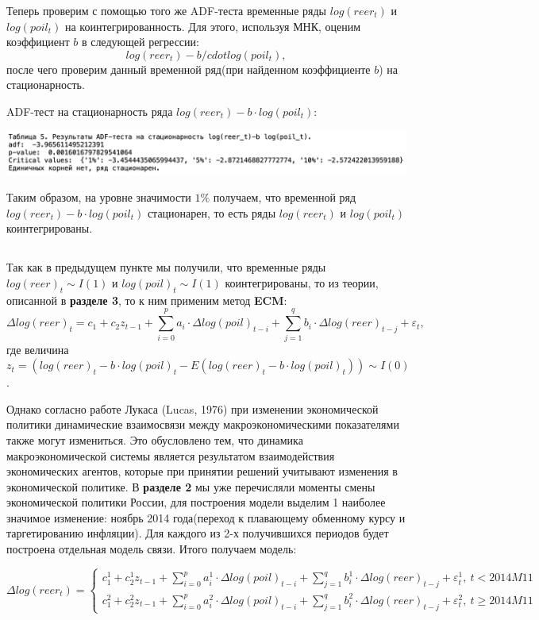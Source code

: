 \documentclass{article}
\begin{document}
Теперь проверим с помощью того же ADF-теста временные ряды $log(reer_t)$ и $log(poil_t)$ на коинтегрированность. Для этого, используя МНК, оценим коэффициент $b$ в следующей регрессии:
$$log(reer_t)-b/cdot log(poil_t),$$
после чего проверим данный временной ряд(при найденном коэффициенте $b$) на стационарность.

ADF-тест на стационарность ряда $log(reer_t)-b\cdot log(poil_t)$:
\begin{center}
\includegraphics[width=150mm]{pics/table_adf.png}
\end{center}
Таким образом, на уровне значимости $1\%$ получаем, что временной ряд $log(reer_t)-b\cdot log(poil_t)$  стационарен, то есть ряды $log(reer_t)$ и $log(poil_t)$ коинтегрированы.

\subsection{}
Так как в предыдущем пункте мы получили, что временные ряды$log(reer)_t\sim I(1)$ и $log(poil)_t\sim I(1)$ коинтегрированы, то из теории, описанной в \textbf{разделе 3}, то к ним применим метод \textbf{ECM}:
$$\Delta log(reer)_t=c_1+c_2z_{t-1}+\sum_{i=0}^p{a_i\cdot \Delta log(poil)_{t-i}}+\sum_{j=1}^q{b_i \cdot \Delta log(reer)_{t-j}}+\varepsilon_t,$$
где величина $z_t=(log(reer)_t-b\cdot log(poil)_t-E(log(reer)_t-b\cdot log(poil)_t))\sim I(0)$.

Однако согласно работе Лукаса (Lucas, 1976) при изменении экономической политики динамические взаимосвязи между макроэкономическими показателями также могут измениться. Это обусловлено тем, что динамика макроэкономической системы является результатом взаимодействия экономических агентов, которые при принятии решений учитывают изменения в экономической политике. В \textbf{разделе 2} мы уже перечисляли моменты смены экономической политики России, для построения модели выделим 1 наиболее значимое изменение: ноябрь 2014 года(переход к плавающему обменному курсу и таргетированию инфляции). Для каждого из 2-х получившихся периодов будет построена отдельная модель связи. Итого получаем модель:

\begin{equation*}
\Delta log(reer_t)=
 \begin{cases}
   c^1_1+c^1_2z_{t-1}+\sum_{i=0}^p{a^1_i\cdot \Delta log(poil)_{t-i}}+\sum_{j=1}^q{b^1_i \cdot \Delta log(reer)_{t-j}}+\varepsilon^1_t,~t<2014M11
   \\
   c^2_1+c^2_2z_{t-1}+\sum_{i=0}^p{a^2_i\cdot \Delta log(poil)_{t-i}}+\sum_{j=1}^q{b^2_i \cdot \Delta log(reer)_{t-j}}+\varepsilon^2_t,~t\geq 2014M11
 \end{cases}
\end{equation*}
\end{document}
